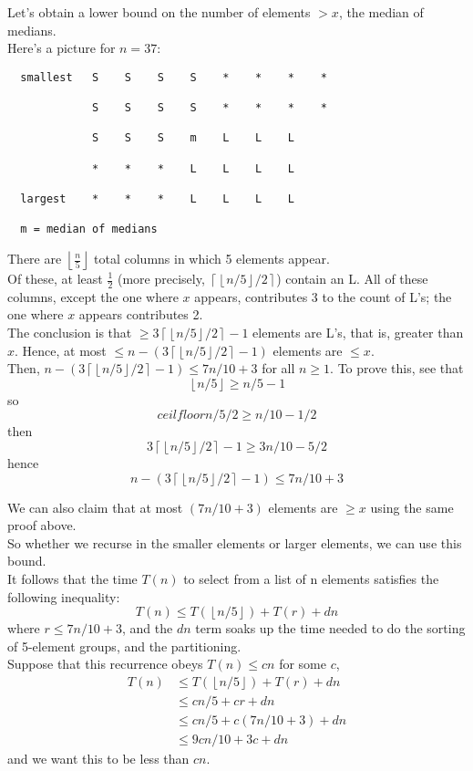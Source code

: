 \documentclass[12pt]{article}
\theoremstyle{plain}
\theoremstyle{definition}
\newcommand{\floor}[1]{\ensuremath{\left\lfloor #1 \right\rfloor}}
\newcommand{\ceil}[1]{\ensuremath{\left\lceil #1 \right\rceil}}
\begin{document}
Let's obtain a lower bound on the number of elements $> x$, the median of medians. \\
Here's a picture for $n = 37$:
\begin{verbatim}
  smallest   S    S    S    S    *    *    *    *

             S    S    S    S    *    *    *    *

             S    S    S    m    L    L    L

             *    *    *    L    L    L    L

  largest    *    *    *    L    L    L    L

  m = median of medians
\end{verbatim}

There are $\floor{\frac{n}{5}}$ total columns in which 5 elements appear. \\
Of these, at least $\frac{1}{2}$ (more precisely, $\ceil{\floor{n/5}/2}$) contain an L.
All of these columns, except the one where $x$ appears, contributes 3 to the count of L's; the one where $x$ appears contributes 2. \\

The conclusion is that $\geq 3\ceil{\floor{n/5}/2} - 1$ elements are L's, that is, greater than $x$.
Hence, at most $\leq n - (3\ceil{\floor{n/5}/2} - 1)$ elements are $\leq x$. \\

Then, $n - (3\ceil{\floor{n/5}/2} - 1) \leq 7n/10 + 3$ for all $n \geq 1$.
To prove this, see that
$$\floor{n/5} \geq n/5 - 1$$
so
$$ceil{floor{n/5}/2} \geq n/10 - 1/2$$
then
$$3\ceil{\floor{n/5}/2} - 1 \geq 3n/10 - 5/2$$
hence
$$n - (3\ceil{\floor{n/5}/2} - 1) \leq 7n/10 + 3$$

We can also claim that at most $(7n/10 + 3)$ elements are $\geq x$ using the same proof above. \\
So whether we recurse in the smaller elements or larger elements, we can use this bound. \\

It follows that the time $T(n)$ to select from a list of n elements satisfies the following inequality:
$$T(n) \leq T(\floor{n/5}) + T(r) + dn$$
where $r \leq 7n/10 + 3$, and the $dn$ term soaks up the time needed to do the sorting of 5-element groups, and the partitioning. \\

Suppose that this recurrence obeys $T(n) \leq cn$ for some $c$,
\begin{align*}
T(n) &\leq T(\floor{n/5}) + T(r) + dn \\
&\leq cn/5 + cr + dn \\
&\leq cn/5 + c(7n/10 + 3) + dn \\
&\leq 9cn/10 + 3c + dn
\end{align*}
and we want this to be less than $cn$. \\
\end{document}
